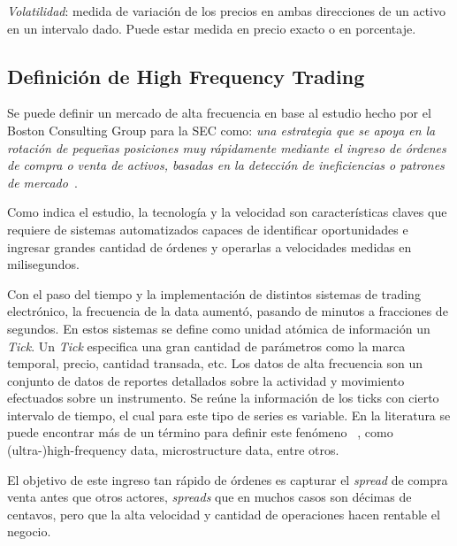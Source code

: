 \emph{Volatilidad}: medida de variación de los precios en ambas direcciones de
un activo en un intervalo dado. Puede estar medida en precio exacto o en
porcentaje.


\subsection{Definición de High Frequency Trading}

Se puede definir un mercado de alta frecuencia en base al estudio hecho por el
Boston Consulting Group para la SEC como: \emph{una estrategia que se apoya
en la rotación de pequeñas posiciones muy rápidamente mediante el ingreso de
órdenes de compra o venta de activos, basadas en la detección de ineficiencias
o patrones de mercado}~\cite{genccay2001introduction}.

Como indica el estudio, la tecnología y la velocidad son características claves
que requiere de sistemas automatizados capaces de identificar oportunidades
e ingresar grandes cantidad de órdenes y operarlas a velocidades medidas en
milisegundos.

Con el paso del tiempo y la implementación de distintos sistemas de trading
electrónico, la frecuencia de la data aumentó, pasando de minutos a fracciones
de segundos.  En estos sistemas se define como unidad atómica de información un
\emph{Tick}. Un \emph{Tick} especifica una gran cantidad de parámetros como la
marca temporal, precio, cantidad transada, etc. Los datos de alta frecuencia
son un conjunto de datos de reportes detallados sobre la actividad y movimiento
efectuados sobre un instrumento. Se reúne la información de los ticks con
cierto intervalo de tiempo, el cual para este tipo de series es variable. En la
literatura se puede encontrar más de un término para definir este fenómeno
~\cite{ei2007quantitative}, como (ultra-)high-frequency data, microstructure
data, entre otros. 


El objetivo de este ingreso tan rápido de órdenes es capturar el \emph{spread}
de compra venta antes que otros actores, \emph{spreads} que en muchos casos son
décimas de centavos, pero que la alta velocidad y cantidad de operaciones hacen
rentable el negocio.

